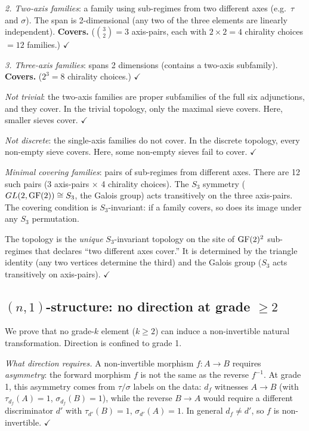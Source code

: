 \emph{2. Two-axis families}: a family using sub-regimes
from two different axes (e.g.\ $\tau$ and $\sigma$).
The span is 2-dimensional (any two of the three elements
are linearly independent). \textbf{Covers.}
($\binom{3}{2} = 3$ axis-pairs, each with $2 \times 2 = 4$
chirality choices $= 12$ families.) $\checkmark$

\emph{3. Three-axis families}: spans 2 dimensions
(contains a two-axis subfamily). \textbf{Covers.}
($2^3 = 8$ chirality choices.) $\checkmark$

\emph{Not trivial}: the two-axis families are proper
subfamilies of the full six adjunctions, and they cover.
In the trivial topology, only the maximal sieve covers.
Here, smaller sieves cover. $\checkmark$

\emph{Not discrete}: the single-axis families do not
cover. In the discrete topology, every non-empty sieve
covers. Here, some non-empty sieves fail to cover.
$\checkmark$

\emph{Minimal covering families}: pairs of sub-regimes
from different axes. There are 12 such pairs (3 axis-pairs
$\times$ 4 chirality choices). The $S_3$ symmetry
($GL(2, \operatorname{GF}(2)) \cong S_3$, the Galois group) acts
transitively on the three axis-pairs. The covering
condition is $S_3$-invariant: if a family covers, so
does its image under any $S_3$ permutation.

The topology is the \emph{unique} $S_3$-invariant
topology on the site of $\operatorname{GF}(2)^2$ sub-regimes that
declares ``two different axes cover.'' It is determined
by the triangle identity (any two vertices determine the
third) and the Galois group ($S_3$ acts transitively on
axis-pairs). $\checkmark$


\subsection{$(n,1)$-structure: no direction at grade $\geq 2$}
\label{app:no-direction-grade2}

We prove that no grade-$k$ element ($k \geq 2$) can
induce a non-invertible natural transformation. Direction
is confined to grade 1.

\emph{What direction requires.}
A non-invertible morphism $f: A \to B$ requires
\emph{asymmetry}: the forward morphism $f$ is not the
same as the reverse $f^{-1}$. At grade 1, this asymmetry
comes from $\tau/\sigma$ labels on the data: $d_f$
witnesses $A \to B$ (with $\tau_{d_f}(A) = 1$,
$\sigma_{d_f}(B) = 1$), while the reverse $B \to A$
would require a different discriminator $d'$ with
$\tau_{d'}(B) = 1$, $\sigma_{d'}(A) = 1$. In general
$d_f \neq d'$, so $f$ is non-invertible. $\checkmark$

